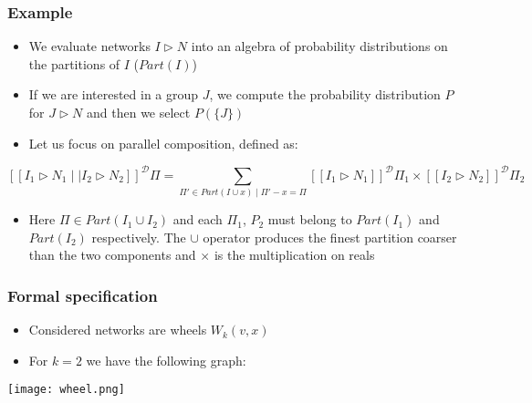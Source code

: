 \documentclass{beamer}
\begin{document}
\begin{frame}
\frametitle{Example}
\begin{itemize}
	\item We evaluate networks $I \triangleright N$ into an algebra of probability distributions
	on the partitions of $I$ ($Part(I)$)
\medskip
	\item If we are interested in a group $J$, we compute the probability distribution $P$ for
	$J \triangleright N$ and then we select $P(\{J\})$
\medskip
	\item Let us focus on parallel composition, defined as:
\end{itemize}
		\[ [\![ I_1 \triangleright N_1 \mid \mid I_2 \triangleright N_2 ]\!]^{\mathcal{D}}\Pi =
		\sum_{\Pi' \in Part(I \cup {x}) \mid \Pi'-x = \Pi} 
		[\![ I_1 \triangleright N_1 ]\!]^{\mathcal{D}}\Pi_1 \times
		[\![ I_2 \triangleright N_2 ]\!]^{\mathcal{D}}\Pi_2 \]
\begin{itemize}
	\item Here $\Pi \in Part(I_1 \cup I_2)$ and each $\Pi_1$, $P_2$ must belong to $Part(I_1)$
	and $Part(I_2)$ respectively. The $\cup$ operator produces the finest partition coarser than 
	the two components and $\times$ is the multiplication on reals
\end{itemize}
\end{frame}

\begin{frame}
\frametitle{Formal specification}
\begin{itemize}
	\item Considered networks are wheels $W_k(v,x)$
\medskip
	\item For $k = 2$ we have the following graph:
\end{itemize}
\begin{center}
	\texttt{[image: wheel.png]}      
\end{center}
\end{frame}
\end{document}
